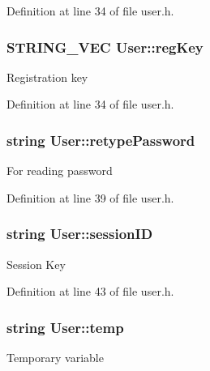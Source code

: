 Definition at line 34 of file user.\-h.

\hypertarget{classUser_a8753abeefb69d3c9db3c585992c7944f}{
\subsubsection[{reg\-Key}]{\setlength{\rightskip}{0pt plus 5cm}S\-T\-R\-I\-N\-G\-\_\-\-V\-E\-C User\-::reg\-Key\hspace{0.3cm}{\ttfamily [protected]}}}\label{classUser_a8753abeefb69d3c9db3c585992c7944f}
Registration key 

Definition at line 34 of file user.\-h.

\hypertarget{classUser_af51ac37cc65721f03e592311d7ead4d4}{
\subsubsection[{retype\-Password}]{\setlength{\rightskip}{0pt plus 5cm}string User\-::retype\-Password\hspace{0.3cm}{\ttfamily [protected]}}}\label{classUser_af51ac37cc65721f03e592311d7ead4d4}
For reading password 

Definition at line 39 of file user.\-h.

\hypertarget{classUser_ab60b88d500e9575634790a518dc584d7}{
\subsubsection[{session\-I\-D}]{\setlength{\rightskip}{0pt plus 5cm}string User\-::session\-I\-D\hspace{0.3cm}{\ttfamily [protected]}}}\label{classUser_ab60b88d500e9575634790a518dc584d7}
Session Key 

Definition at line 43 of file user.\-h.

\hypertarget{classUser_a03e84c43560a0cd720fbff832ade1d08}{
\subsubsection[{temp}]{\setlength{\rightskip}{0pt plus 5cm}string User\-::temp\hspace{0.3cm}{\ttfamily [protected]}}}\label{classUser_a03e84c43560a0cd720fbff832ade1d08}
Temporary variable 

